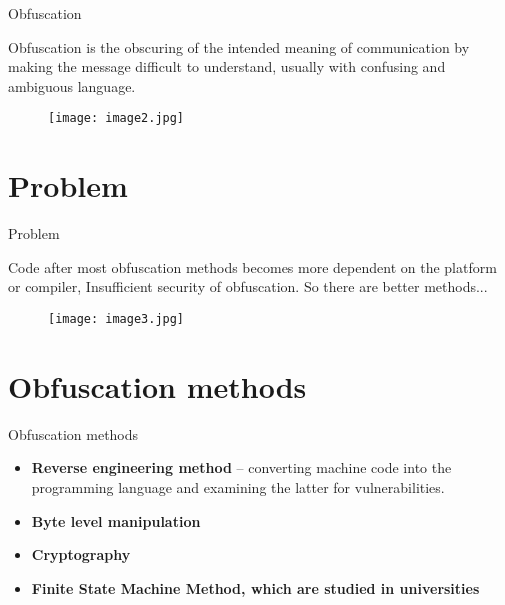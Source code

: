 \documentclass{beamer}
\begin{document}
\begin{frame}{Obfuscation}

\alert{Obfuscation} is the obscuring of the intended meaning of communication by making the message difficult to understand, usually with confusing and ambiguous language.

\begin{figure}
\texttt{[image: image2.jpg]} 
\label{fig:fig2}
\end{figure}

\end{frame}


\section{Problem}
\begin{frame}{Problem}

Code after most obfuscation methods becomes more dependent on the platform or compiler, Insufficient security of obfuscation.
So there are better methods...

\begin{figure}
\texttt{[image: image3.jpg]} 
\label{fig:fig3}
\end{figure}

\end{frame}


\section{Obfuscation methods}
\begin{frame}{Obfuscation methods}

\begin{itemize}
    \item \textbf{Reverse engineering method} – converting machine code into the programming language and examining the latter for vulnerabilities.
    \item \textbf{Byte level manipulation}
    \item \textbf{Cryptography}
    \item \textbf{Finite State Machine Method, which are studied in universities}
\end{itemize}

\end{frame}
\end{document}
